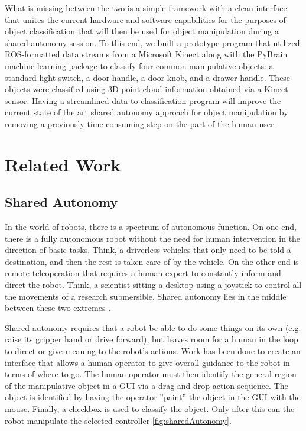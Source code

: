 \documentclass{article}
\begin{document}
What is missing between the two is a simple framework with a clean interface that unites the current hardware and software capabilities for the purposes of object classification that will then be used for object manipulation during a shared autonomy session. To this end, we built a prototype program that utilized ROS-formatted data streams from a Microsoft Kinect along with the PyBrain machine learning package to classify four common manipulative objects: a standard light switch, a door-handle, a door-knob, and a drawer handle. These objects were classified using 3D point cloud information obtained via a Kinect sensor. Having a streamlined data-to-classification program will improve the current state of the art shared autonomy approach for object manipulation by removing a previously time-consuming step on the part of the human user.

\section{Related Work}
\subsection{Shared Autonomy}
In the world of robots, there is a spectrum of autonomous function.  On one end, there is a fully autonomous robot
without the need for human intervention in the direction of basic tasks.  Think, a driverless vehicles that only need to be told a destination, and then the rest is taken care of by the vehicle.  On the other end is remote teleoperation that requires a human expert to constantly inform and direct the robot.  Think, a scientist sitting a desktop using a joystick to control all the movements of a research submersible. Shared autonomy lies in the middle between these two extremes \cite{sharedAutonomy}. 

Shared autonomy requires that a robot be able to do some things on its own (e.g. raise its gripper hand or drive forward), but leaves
room for a human in the loop to direct or give meaning to the robot's actions. Work has been done to create an interface that
allows a human operator to give overall guidance to the robot in terms of where to go. The human operator must then identify the general region of the manipulative object in a GUI via a drag-and-drop action sequence.  The object is identified by having the operator ''paint'' the object in the GUI with the mouse.  Finally, a checkbox is used to classify the object.  Only after this can the robot manipulate the selected controller \ref{fig:sharedAutonomy}\cite{matt}. 
\end{document}
